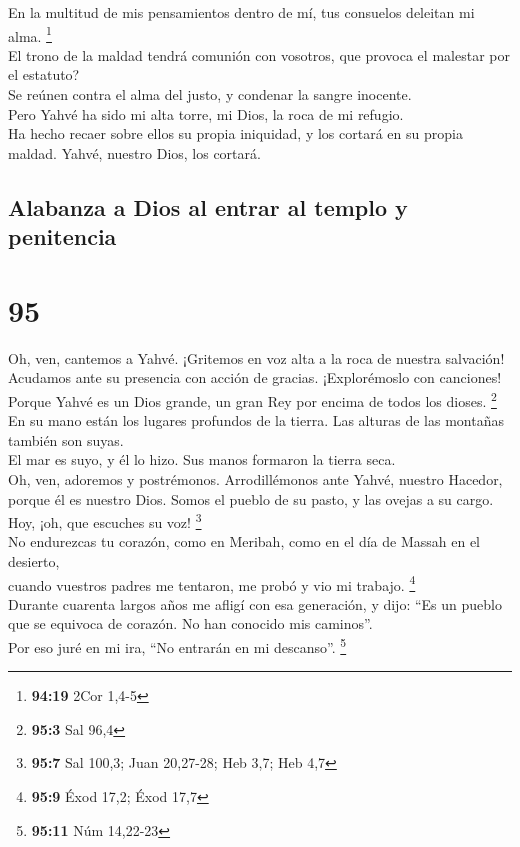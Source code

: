  En la multitud de mis pensamientos dentro de mí, tus
consuelos deleitan mi alma. \footnote{\textbf{94:19} 2Cor 1,4-5}\\
 El trono de la maldad tendrá comunión con vosotros, que
provoca el malestar por el estatuto?\\
 Se reúnen contra el alma del justo, y condenar la sangre
inocente.\\
 Pero Yahvé ha sido mi alta torre, mi Dios, la roca de mi
refugio.\\
 Ha hecho recaer sobre ellos su propia iniquidad, y los
cortará en su propia maldad. Yahvé, nuestro Dios, los cortará.

\hypertarget{alabanza-a-dios-al-entrar-al-templo-y-penitencia}{%
\subsection{Alabanza a Dios al entrar al templo y
penitencia}\label{alabanza-a-dios-al-entrar-al-templo-y-penitencia}}

\hypertarget{section-92}{%
\section{95}\label{section-92}}

 Oh, ven, cantemos a Yahvé. ¡Gritemos en voz alta a la
roca de nuestra salvación!\\
 Acudamos ante su presencia con acción de gracias.
¡Explorémoslo con canciones!\\
 Porque Yahvé es un Dios grande, un gran Rey por encima de
todos los dioses. \footnote{\textbf{95:3} Sal 96,4}\\
 En su mano están los lugares profundos de la tierra. Las
alturas de las montañas también son suyas.\\
 El mar es suyo, y él lo hizo. Sus manos formaron la
tierra seca.\\
 Oh, ven, adoremos y postrémonos. Arrodillémonos ante
Yahvé, nuestro Hacedor,\\
 porque él es nuestro Dios. Somos el pueblo de su pasto, y
las ovejas a su cargo. Hoy, ¡oh, que escuches su voz! \footnote{\textbf{95:7}
  Sal 100,3; Juan 20,27-28; Heb 3,7; Heb 4,7}\\
 No endurezcas tu corazón, como en Meribah, como en el día
de Massah en el desierto,\\
 cuando vuestros padres me tentaron, me probó y vio mi
trabajo. \footnote{\textbf{95:9} Éxod 17,2; Éxod 17,7}\\
 Durante cuarenta largos años me afligí con esa
generación, y dijo: ``Es un pueblo que se equivoca de corazón. No han
conocido mis caminos''.\\
 Por eso juré en mi ira, ``No entrarán en mi descanso''.
\footnote{\textbf{95:11} Núm 14,22-23}

